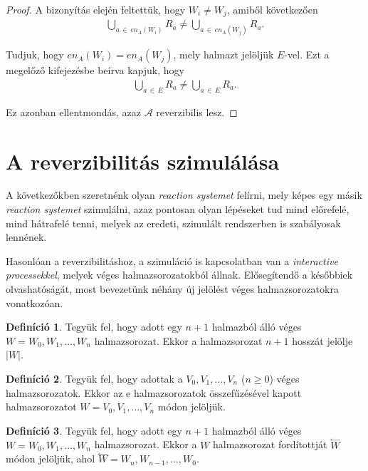 \documentclass[12pt]{article}
\theoremstyle{definition}
\newtheorem{definition}{Definíció}
\theoremstyle{remark}
\theoremstyle{plain}
\theoremstyle{remark}
\theoremstyle{plain}
\newcommand{\backwardhat}{\overset{\leftharpoonup}}
\newcommand{\en}{\textit{en}}
\begin{document}
\begin{proof}
        A bizonyítás elején feltettük, hogy $W_{i} \neq W_{j}$, amiből következően
        \begin{align*}
            \bigcup\limits_{a \,\in\, \en_{A}(W_{i})} R_{a} \neq \bigcup\limits_{a \,\in\, \en_{A}(W_{j})} R_{a}.
        \end{align*}

        Tudjuk, hogy $\en_{A}(W_{i}) = \en_{A}(W_{j})$, mely halmazt jelöljük $E$-vel. Ezt a megelőző kifejezésbe beírva kapjuk, hogy
        \begin{align*}
            \bigcup\limits_{a \,\in\, E} R_{a} \neq \bigcup\limits_{a \,\in\, E} R_{a}.
        \end{align*}
        
        Ez azonban ellentmondás, azaz $\mathscr{A}$ reverzibilis lesz.
    \end{proof}

    \section*{A reverzibilitás szimulálása}

    A következőkben szeretnénk olyan \textit{reaction systemet} felírni, mely képes egy másik \textit{reaction systemet} szimulálni, azaz pontosan olyan lépéseket tud mind előrefelé, mind hátrafelé tenni, melyek az eredeti, szimulált rendszerben is szabályosak lennének.
    
    Hasonlóan a reverzibilitáshoz, a szimuláció is kapcsolatban van a \textit{interactive processekkel}, melyek véges halmazsorozatokból állnak. Elősegítendő a későbbiek olvashatóságát, most bevezetünk néhány új jelölést véges halmazsorozatokra vonatkozóan.

    \begin{definition}
        Tegyük fel, hogy adott egy $n + 1$ halmazból álló véges $W=W_{0}, W_{1}, \ldots, W_{n}$ halmazsorozat. Ekkor a halmazsorozat $n + 1$ hosszát jelölje $|W|$.
    \end{definition}

    \begin{definition}
        Tegyük fel, hogy adottak a $V_{0}, V_{1}, \ldots, V_{n}$ ($n \geq 0$) véges halmazsorozatok. Ekkor az e halmazsorozatok összefűzésével kapott halmazsorozatot $W = V_{0}, V_{1}, \ldots, V_{n}$ módon jelöljük.
    \end{definition}

    \begin{definition}
        Tegyük fel, hogy adott egy $n + 1$ halmazból álló véges $W=W_{0}, W_{1}, \ldots, W_{n}$ halmazsorozat. Ekkor a $W$ halmazsorozat fordítottját $\backwardhat W$ módon jelöljük, ahol $\backwardhat W = W_{n}, W_{n - 1}, \ldots, W_{0}$.
    \end{definition}
\end{document}
